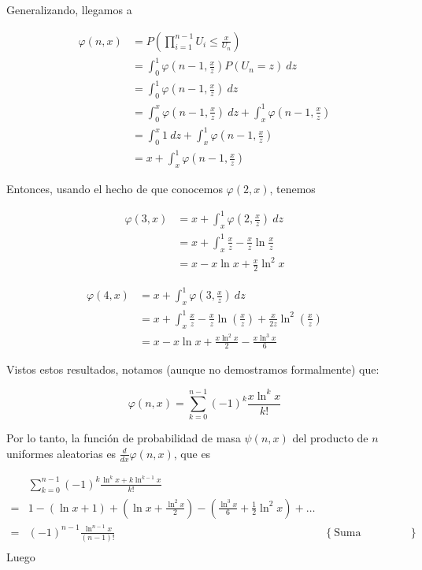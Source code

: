 \documentclass[a4paper, 12pt]{article}
\begin{document}
Generalizando, llegamos a

\begin{align*}
  \varphi(n, x) 
  &= P\left(\prod_{i=1}^{n-1} U_i \leq \frac{x}{U_n}\right)  \\ 
  &= \int_0^1 \varphi\left(n-1, \frac{x}{z}\right) P(U_n = z) ~ dz \\ 
  &=\int_0^1 \varphi\left(n-1, \frac{x}{z}\right) ~ dz \\ 
  &=\int_0^x \varphi \left( n - 1, \frac{x}{z} \right) ~ dz + \int_x^1 \varphi
  \left( n - 1, \frac{x}{z} \right) \\ 
  &= \int_0^x 1 ~ dz + \int_x^{1} \varphi\left( n-1, \frac{x}{z} \right)  \\ 
  &= x + \int_x^1 \varphi\left( n-1, \frac{x}{z} \right) 
\end{align*}

Entonces, usando el hecho de que conocemos $\varphi(2, x)$, tenemos 

\begin{align*}
  \varphi(3, x) 
  &= x + \int_x^1 \varphi(2, \frac{x}{z}) ~ dz  \\ 
  &=x + \int_x^1 \frac{x}{z}-\frac{x}{z} \ln \frac{x}{z} \\ 
  &= x - x\ln x + \frac{x}{2} \ln^2 x
\end{align*}

\begin{align*}
  \varphi(4, x) 
  &= x + \int_x^1 \varphi(3, \frac{x}{z}) ~ dz  \\ 
  &=
  x + \int_x^1 \frac{x}{z} -\frac{x}{z} \ln\left( \frac{x}{z} \right) + \frac{x}{2z} \ln^2 \left( \frac{x}{z} \right)   \\ 
  &=x - x \ln x + \frac{x \ln^2 x}{2} - \frac{x \ln^3 x}{6}
\end{align*}

Vistos estos resultados, notamos (aunque no demostramos formalmente) que:

\begin{equation*}
  \varphi(n, x) = \sum_{k=0}^{n-1} \left( -1 \right)^{k} \frac{x \ln^k x}{k!}
\end{equation*}

Por lo tanto, la función de probabilidad de masa $\psi(n, x)$ del producto de $n$ uniformes
aleatorias es $\frac{d}{dx}\varphi(n, x)$, que es


\begin{align*}
  &\sum_{k=0}^{n-1}(-1)^{k} 
  \frac{\ln^k x + k \ln^{k-1} x}{k!} \\
  =&1 - (\ln x + 1) + \left(\ln x + \frac{ \ln^2 x }{2}\right) -
  \left( \frac{\ln^3 x}{6} + \frac{1}{2}\ln^2 x \right)  + \ldots \\ 
  =& (-1)^{n-1} \frac{\ln^{n-1} x}{(n-1)!}  &\left\{ \text{Suma telescópica} \right\} \\ 
\end{align*}
Luego 
\end{document}

